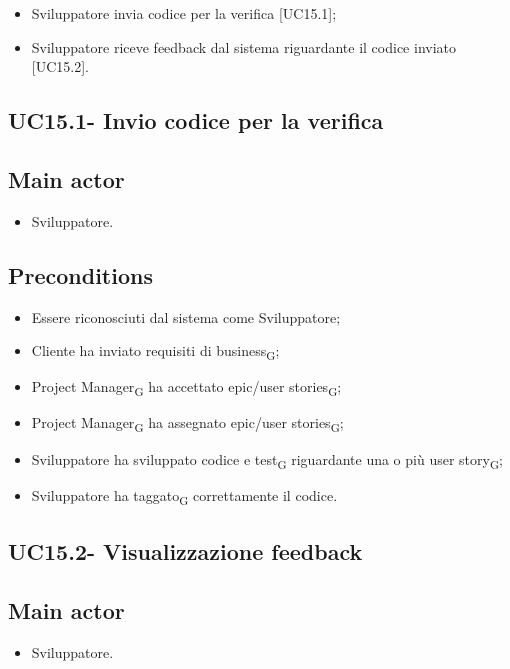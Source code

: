 \documentclass{article}
\begin{document}
        \begin{itemize}
            \item Sviluppatore invia codice per la verifica [UC15.1];

            \item Sviluppatore riceve feedback dal sistema riguardante il codice inviato [UC15.2].
        \end{itemize}
        
    \subsection{UC15.1- Invio codice per la verifica}
    \subsection*{Main actor}
        \begin{itemize}
            \item Sviluppatore.
        \end{itemize}
        
    \subsection*{Preconditions}
        \begin{itemize}
            \item Essere riconosciuti dal sistema come Sviluppatore;
            \item Cliente ha inviato requisiti di business\textsubscript{G};
            \item Project Manager\textsubscript{G} ha accettato epic/user stories\textsubscript{G};
            \item Project Manager\textsubscript{G} ha assegnato epic/user stories\textsubscript{G};
            \item Sviluppatore ha sviluppato codice e test\textsubscript{G} riguardante una o più user story\textsubscript{G};
            \item Sviluppatore ha taggato\textsubscript{G} correttamente il codice.
        \end{itemize}
        
    \subsection{UC15.2- Visualizzazione feedback}
    \subsection*{Main actor}
        \begin{itemize}
            \item Sviluppatore.
        \end{itemize}
        
\end{document}
